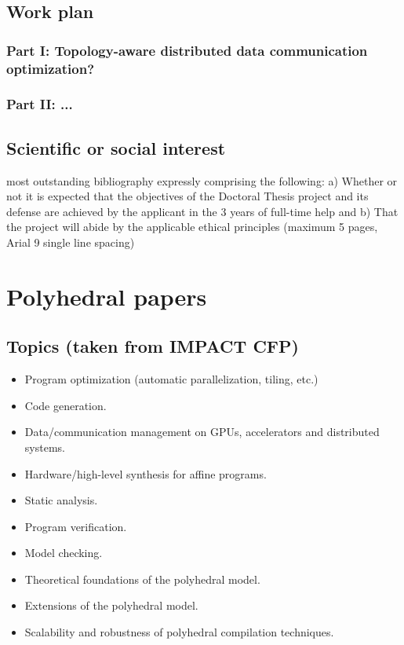 \documentclass[a4paper, 11pt]{article}
\begin{document}
\subsection{Work plan}
\subsubsection{Part I: Topology-aware distributed data communication optimization?}
\subsubsection{Part II: ...}


\subsection{Scientific or social interest}

most outstanding bibliography expressly comprising the following: a) Whether or not it is expected that the objectives of the Doctoral Thesis project and its defense are achieved by the applicant in the 3 years of full-time help and b) That the project will abide by the applicable ethical principles (maximum 5 pages, Arial 9 single line spacing) 

\section{Polyhedral papers}\label{sec:polly_papers}
\subsection{Topics (taken from IMPACT CFP)}
\begin{itemize}
    \item Program optimization (automatic parallelization, tiling, etc.)
    \item Code generation.
    \item Data/communication management on GPUs, accelerators and distributed systems.
    \item Hardware/high-level synthesis for affine programs.
    \item Static analysis.
    \item Program verification.
    \item Model checking.
    \item Theoretical foundations of the polyhedral model.
    \item Extensions of the polyhedral model.
    \item Scalability and robustness of polyhedral compilation techniques.
\end{itemize}
\end{document}
